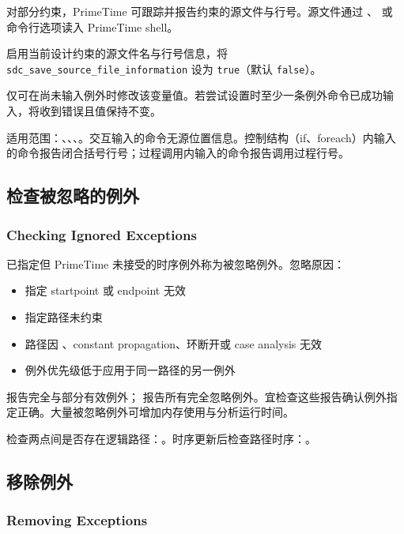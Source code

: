 对部分约束，PrimeTime 可跟踪并报告约束的源文件与行号。源文件通过 、 或  命令行选项读入 PrimeTime shell。

启用当前设计约束的源文件名与行号信息，将 \texttt{sdc\_save\_source\_file\_information} 设为 \texttt{true}（默认 \texttt{false}）。

\begin{noteBox}
仅可在尚未输入例外时修改该变量值。若尝试设置时至少一条例外命令已成功输入，将收到错误且值保持不变。
\end{noteBox}

适用范围：、、、。交互输入的命令无源位置信息。控制结构（if、foreach）内输入的命令报告闭合括号行号；过程调用内输入的命令报告调用过程行号。

\subsection{检查被忽略的例外}
\subsubsection*{Checking Ignored Exceptions}

已指定但 PrimeTime 未接受的时序例外称为被忽略例外。忽略原因：
\begin{itemize}
  \item 指定 startpoint 或 endpoint 无效
  \item 指定路径未约束
  \item 路径因 、constant propagation、环断开或 case analysis 无效
  \item 例外优先级低于应用于同一路径的另一例外
\end{itemize}

 报告完全与部分有效例外； 报告所有完全忽略例外。宜检查这些报告确认例外指定正确。大量被忽略例外可增加内存使用与分析运行时间。

检查两点间是否存在逻辑路径：。时序更新后检查路径时序：。

\subsection{移除例外}
\subsubsection*{Removing Exceptions}

